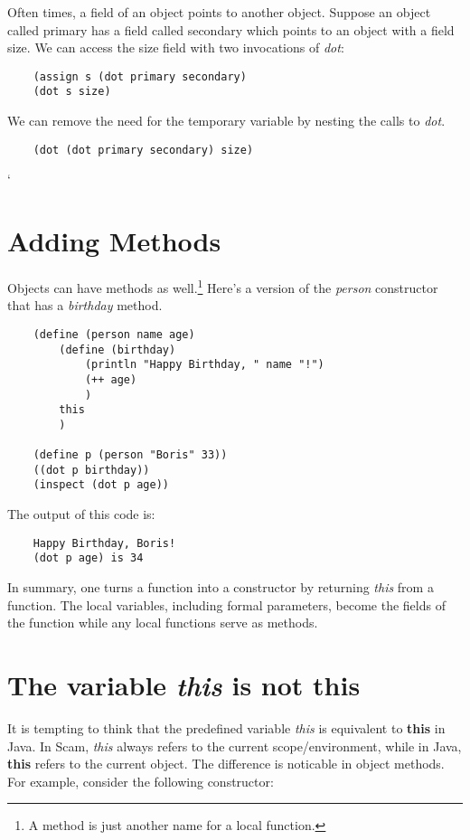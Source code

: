 Often times, a field of an object points to another object.
Suppose an object called primary has a field called secondary
which points to an object with a field size. We can access
the size field with two invocations of {\it dot}:

\begin{verbatim}
    (assign s (dot primary secondary)
    (dot s size)
\end{verbatim}

We can remove the need for the temporary variable by nesting the
calls to {\it dot}.

\begin{verbatim}
    (dot (dot primary secondary) size)
\end{verbatim}
`
\section{Adding Methods}

Objects can have methods as well.\footnote{
A method is just another name for a local function.
}
Here's a version of the
{\it person} constructor that has a {\it birthday} method.

\begin{verbatim}
    (define (person name age)
        (define (birthday)
            (println "Happy Birthday, " name "!")
            (++ age)
            )
        this
        )
        
    (define p (person "Boris" 33))
    ((dot p birthday))
    (inspect (dot p age))
\end{verbatim}

The output of this code is:

\begin{verbatim}
    Happy Birthday, Boris!
    (dot p age) is 34
\end{verbatim}

In summary, one turns a function into a constructor by returning
{\it this}
from a function. The local variables, including
formal parameters, become the fields of the function while
any local functions serve as methods.

\section{The variable {\it this} is not {\bf this}}

It is tempting to think that the predefined variable {\it this} is
equivalent to {\bf this} in Java.
In Scam, {\it this} always refers to the current scope/environment,
while in Java, {\bf this} refers to the current object. The difference
is noticable in object methods. For example, consider the following
constructor:

